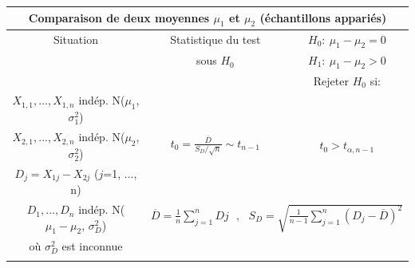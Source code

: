 \documentclass [12pt]{article}
\begin{document}
\begin{center}
\begin{tabular}{|c|c|c|}
\hline
 \multicolumn{3}{|c|}{{\bf Comparaison de deux moyennes
$\mu_1$ et $\mu_2$ (échantillons appariés)}}
\\
\hline Situation & Statistique du test & $H_{0}:\ \mu_1-\mu_2 = 0$
\\
& sous $H_{0}$ & $H_{1}:\  \mu_1-\mu_2 > 0$
\\
& & Rejeter $H_{0}$ si:
\\
\hline \hline 
$X_{1,1}, ..., X_{1,n}$ indép. N($\mu_1$, $\sigma^2_1$)& & \\
$X_{2,1}, ..., X_{2,n}$ indép. N($\mu_2$, $\sigma^2_2$)
&$\displaystyle t_0 = \frac{\overline D}{S_D/\sqrt n} \sim
t_{n-1}$ & $t_0 > t_{\alpha, n-1}$
\\
$D_j = X_{1j} - X_{2j}$  ({\small $j$=1, ...,
n})&\multicolumn{2}{|c|}{ }
\\
$D_1, ...,D_n$ indép. N($\mu_1-\mu_2$, $\sigma^2_D$) &
\multicolumn{2}{|c|}{$\overline D = \frac{1}{n}
\displaystyle\sum^n_{j=1} Dj~~~,~~~S_D = \sqrt{\frac{1}{n-1}
\displaystyle\sum^n_{j=1} (D_j - \overline D)^2}$}
\\
où $\sigma^2_D$ est inconnue& \multicolumn{2}{c|}{}
\\
\hline \multicolumn{3}{c}{ }
\\

\end{tabular}
\end{center}
\end{document}
